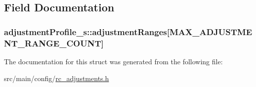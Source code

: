 \subsection{Field Documentation}
\hypertarget{structadjustmentProfile__s_a8b8d07c4b71ba295d73b16481768283a}{
\subsubsection[{adjustment\+Ranges}]{ adjustment\+Profile\+\_\+s\+::adjustment\+Ranges\mbox{[}{\bf M\+A\+X\+\_\+\+A\+D\+J\+U\+S\+T\+M\+E\+N\+T\+\_\+\+R\+A\+N\+G\+E\+\_\+\+C\+O\+U\+N\+T}\mbox{]}}}\label{structadjustmentProfile__s_a8b8d07c4b71ba295d73b16481768283a}


The documentation for this struct was generated from the following file\+:\begin{DoxyCompactItemize}
\item 
src/main/config/\hyperlink{config_2rc__adjustments_8h}{rc\+\_\+adjustments.\+h}\end{DoxyCompactItemize}
